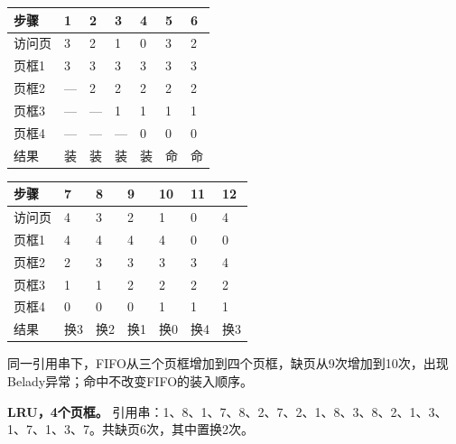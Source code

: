 \begin{wideblock}\par\medskip\noindent\begin{minipage}{\linewidth}\fontsize{9.3}{12}\selectfont\begin{tabularx}{\linewidth}{@{}YYYYYYY@{}}
\toprule\noalign{}
步骤 & 1 & 2 & 3 & 4 & 5 & 6 \\
\midrule\noalign{}


访问页 & 3 & 2 & 1 & 0 & 3 & 2 \\
页框1 & 3 & 3 & 3 & 3 & 3 & 3 \\
页框2 & --- & 2 & 2 & 2 & 2 & 2 \\
页框3 & --- & --- & 1 & 1 & 1 & 1 \\
页框4 & --- & --- & --- & 0 & 0 & 0 \\
结果 & 装 & 装 & 装 & 装 & 命 & 命 \\
\bottomrule\end{tabularx}
\end{minipage}\par\medskip\end{wideblock}

\begin{wideblock}\par\medskip\noindent\begin{minipage}{\linewidth}\fontsize{9.3}{12}\selectfont\begin{tabularx}{\linewidth}{@{}YYYYYYY@{}}
\toprule\noalign{}
步骤 & 7 & 8 & 9 & 10 & 11 & 12 \\
\midrule\noalign{}


访问页 & 4 & 3 & 2 & 1 & 0 & 4 \\
页框1 & 4 & 4 & 4 & 4 & 0 & 0 \\
页框2 & 2 & 3 & 3 & 3 & 3 & 4 \\
页框3 & 1 & 1 & 2 & 2 & 2 & 2 \\
页框4 & 0 & 0 & 0 & 1 & 1 & 1 \\
结果 & 换3 & 换2 & 换1 & 换0 & 换4 & 换3 \\
\bottomrule\end{tabularx}
\end{minipage}\par\medskip\end{wideblock}

同一引用串下，FIFO从三个页框增加到四个页框，缺页从9次增加到10次，出现Belady异常；命中不改变FIFO的装入顺序。

\textbf{LRU，4个页框。} 引用串：1、8、1、7、8、2、7、2、1、8、3、8、2、1、3、1、7、1、3、7。共缺页6次，其中置换2次。

